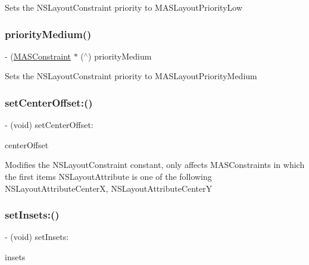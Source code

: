 Sets the N\+S\+Layout\+Constraint priority to M\+A\+S\+Layout\+Priority\+Low \mbox{\label{interface_m_a_s_constraint_a062d888bf6be5751893ac1e5f14ba655}} 
\subsubsection{\texorpdfstring{priority\+Medium()}{priorityMedium()}}
{\footnotesize\ttfamily -\/ (\mbox{\hyperlink{interface_m_a_s_constraint}{M\+A\+S\+Constraint}} $\ast$ ($^\wedge$) priority\+Medium \begin{DoxyParamCaption}{ }\end{DoxyParamCaption}}

Sets the N\+S\+Layout\+Constraint priority to M\+A\+S\+Layout\+Priority\+Medium \mbox{\label{interface_m_a_s_constraint_aa96ccb42da331524a88a85a9e69cb566}} 
\subsubsection{\texorpdfstring{set\+Center\+Offset\+:()}{setCenterOffset:()}}
{\footnotesize\ttfamily -\/ (void) set\+Center\+Offset\+: \begin{DoxyParamCaption}\item[{(C\+G\+Point)}]{center\+Offset }\end{DoxyParamCaption}}

Modifies the N\+S\+Layout\+Constraint constant, only affects M\+A\+S\+Constraints in which the first item\textquotesingle{}s N\+S\+Layout\+Attribute is one of the following N\+S\+Layout\+Attribute\+CenterX, N\+S\+Layout\+Attribute\+CenterY \mbox{\label{interface_m_a_s_constraint_ad626d24e45f780dbf74c6ba71077b0ae}} 
\subsubsection{\texorpdfstring{set\+Insets\+:()}{setInsets:()}}
{\footnotesize\ttfamily -\/ (void) set\+Insets\+: \begin{DoxyParamCaption}\item[{(M\+A\+S\+Edge\+Insets)}]{insets }\end{DoxyParamCaption}}

